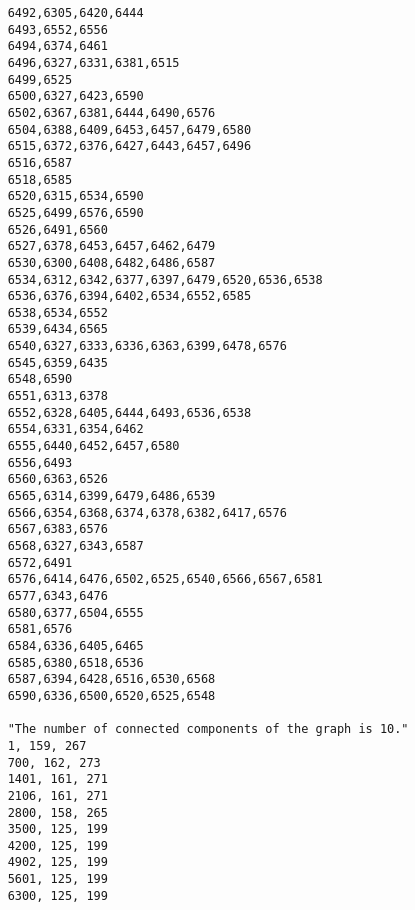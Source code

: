 \documentclass{article}
\begin{document}
\begin{lstlisting}
    6492,6305,6420,6444
    6493,6552,6556
    6494,6374,6461
    6496,6327,6331,6381,6515
    6499,6525
    6500,6327,6423,6590
    6502,6367,6381,6444,6490,6576
    6504,6388,6409,6453,6457,6479,6580
    6515,6372,6376,6427,6443,6457,6496
    6516,6587
    6518,6585
    6520,6315,6534,6590
    6525,6499,6576,6590
    6526,6491,6560
    6527,6378,6453,6457,6462,6479
    6530,6300,6408,6482,6486,6587
    6534,6312,6342,6377,6397,6479,6520,6536,6538
    6536,6376,6394,6402,6534,6552,6585
    6538,6534,6552
    6539,6434,6565
    6540,6327,6333,6336,6363,6399,6478,6576
    6545,6359,6435
    6548,6590
    6551,6313,6378
    6552,6328,6405,6444,6493,6536,6538
    6554,6331,6354,6462
    6555,6440,6452,6457,6580
    6556,6493
    6560,6363,6526
    6565,6314,6399,6479,6486,6539
    6566,6354,6368,6374,6378,6382,6417,6576
    6567,6383,6576
    6568,6327,6343,6587
    6572,6491
    6576,6414,6476,6502,6525,6540,6566,6567,6581
    6577,6343,6476
    6580,6377,6504,6555
    6581,6576
    6584,6336,6405,6465
    6585,6380,6518,6536
    6587,6394,6428,6516,6530,6568
    6590,6336,6500,6520,6525,6548
    
    "The number of connected components of the graph is 10."
    1, 159, 267 
    700, 162, 273 
    1401, 161, 271 
    2106, 161, 271 
    2800, 158, 265 
    3500, 125, 199 
    4200, 125, 199 
    4902, 125, 199 
    5601, 125, 199 
    6300, 125, 199   
  \end{lstlisting}
\end{document}
